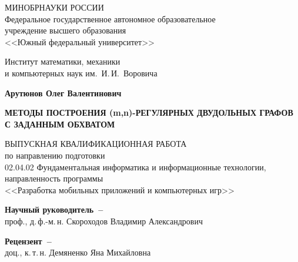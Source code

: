 


\thispagestyle{empty}
\begin{singlespacing} 
\begin{center}

МИНОБРНАУКИ РОССИИ\\ [12pt]
Федеральное государственное автономное образовательное\\
учреждение высшего образования\\
<<Южный федеральный университет>>

\vspace{\baselineskip}
Институт математики, механики\\
и компьютерных наук им.~И.\,И.~Воровича


\vfill
\textbf{Арутюнов Олег Валентинович}

\vspace{15mm}
{\bf МЕТОДЫ ПОСТРОЕНИЯ (m,n)-РЕГУЛЯРНЫХ ДВУДОЛЬНЫХ ГРАФОВ С ЗАДАННЫМ ОБХВАТОМ }

\vspace{15mm}
ВЫПУСКНАЯ КВАЛИФИКАЦИОННАЯ РАБОТА\\
по направлению подготовки\\
02.04.02 Фундаментальная информатика и информационные технологии,\\
направленность программы\\
<<Разработка мобильных приложений и компьютерных игр>>

\vspace{10mm}
\textbf{Научный руководитель~--}\\
проф., д.\,ф.-м.\,н. Скороходов Владимир Александрович

\vspace{7mm}
\textbf{Рецензент~--}\\
доц., к.\,т.\,н. Демяненко Яна Михайловна


\vspace{15mm}


\end{center}
\end{singlespacing}
